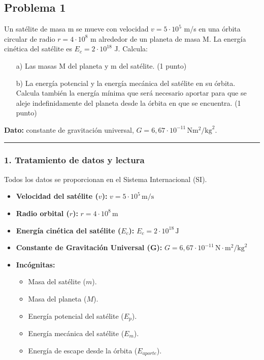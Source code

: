 \newpage
\subsection{Problema 1}
\label{subsec:P1_2024_jul_ext}

\begin{cajaenunciado}
Un satélite de masa m se mueve con velocidad $v=5 \cdot 10^{5}$ m/s en una órbita circular de radio $r=4 \cdot 10^{8}$ m alrededor de un planeta de masa M. La energía cinética del satélite es $E_{c}=2 \cdot 10^{18}$ J. Calcula:
\begin{enumerate}
    \item[a)] Las masas M del planeta y m del satélite. (1 punto)
    \item[b)] La energía potencial y la energía mecánica del satélite en su órbita. Calcula también la energía mínima que será necesario aportar para que se aleje indefinidamente del planeta desde la órbita en que se encuentra. (1 punto)
\end{enumerate}
\textbf{Dato:} constante de gravitación universal, $G=6,67 \cdot 10^{-11} \, \text{N}\text{m}^2/\text{kg}^2$.
\end{cajaenunciado}
\hrule

\subsubsection*{1. Tratamiento de datos y lectura}
Todos los datos se proporcionan en el Sistema Internacional (SI).
\begin{itemize}
    \item \textbf{Velocidad del satélite ($v$):} $v = 5 \cdot 10^{5} \, \text{m/s}$
    \item \textbf{Radio orbital ($r$):} $r = 4 \cdot 10^{8} \, \text{m}$
    \item \textbf{Energía cinética del satélite ($E_c$):} $E_c = 2 \cdot 10^{18} \, \text{J}$
    \item \textbf{Constante de Gravitación Universal (G):} $G = 6,67 \cdot 10^{-11} \, \text{N}\cdot\text{m}^2/\text{kg}^2$
    \item \textbf{Incógnitas:}
    \begin{itemize}
        \item Masa del satélite ($m$).
        \item Masa del planeta ($M$).
        \item Energía potencial del satélite ($E_p$).
        \item Energía mecánica del satélite ($E_m$).
        \item Energía de escape desde la órbita ($E_{aporte}$).
    \end{itemize}
\end{itemize}

